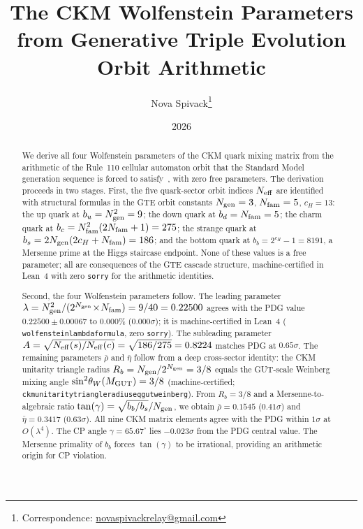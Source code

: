 \documentclass[11pt]{article}
\title{\bfseries The CKM Wolfenstein Parameters\\[0.3em]
from Generative Triple Evolution Orbit Arithmetic}
\author[1]{Nova Spivack\thanks{Correspondence:
  \href{mailto:novaspivackrelay@gmail.com}{novaspivackrelay@gmail.com}}}
\affil[1]{Independent Research}
\date{2026}
\theoremstyle{remark}
\newcommand{\Ngen}{N_{\rm gen}}
\newcommand{\Nfam}{N_{\rm fam}}
\newcommand{\cH}{c_H}
\newcommand{\lean}[1]{%
  \penalty-100
  \begingroup\def\_{\textunderscore\allowbreak}\texttt{#1}\endgroup}
\newcommand{\lam}{\lambda}
\newcommand{\Rbar}{\bar{\rho}}
\newcommand{\Ebar}{\bar{\eta}}
\newcommand{\bu}{b_u}
\newcommand{\bd}{b_d}
\newcommand{\bc}{b_c}
\newcommand{\bs}{b_s}
\newcommand{\bb}{b_b}
\newcommand{\Rb}{R_b}
\newcommand{\sinwsq}{\sin^2\!\theta_W}
\begin{document}
\maketitle
\NovaZenodoAfterTitle

\begin{abstract}
We derive all four Wolfenstein parameters of the CKM quark mixing matrix from
the arithmetic of the Rule~110 cellular automaton orbit that the Standard Model
generation sequence is forced to satisfy~\cite{SpivackCompUniversality},
with zero free parameters.
The derivation proceeds in two stages.
First, the five quark-sector orbit indices $N_{\rm eff}$ are identified with
structural formulas in the GTE orbit constants $\Ngen = 3$, $\Nfam = 5$,
$\cH = 13$: the up quark at $\bu = \Ngen^2 = 9$; the down quark at
$\bd = \Nfam = 5$; the charm quark at $\bc = \Nfam^2(2\Nfam+1) = 275$;
the strange quark at $\bs = 2\Ngen(2\cH+\Nfam) = 186$; and the bottom quark
at $\bb = 2^{\cH}-1 = 8191$, a Mersenne prime at the Higgs staircase endpoint.
None of these values is a free parameter; all are consequences of the GTE
cascade structure, machine-certified in Lean~4 with zero \texttt{sorry}
for the arithmetic identities.

Second, the four Wolfenstein parameters follow.
The leading parameter
$\lam = \Ngen^2/(2^{\Ngen}\!\times\!\Nfam) = 9/40 = 0.22500$
agrees with the PDG value $0.22500\pm 0.00067$ to $\mathbf{0.000\%}$
($0.000\sigma$); it is machine-certified in Lean~4 (\lean{wolfenstein\_lambda\_formula},
zero \texttt{sorry}).
The subleading parameter $A = \sqrt{N_{\rm eff}(s)/N_{\rm eff}(c)} = \sqrt{186/275} = 0.8224$
matches PDG at $0.65\sigma$.
The remaining parameters $\Rbar$ and $\Ebar$ follow from a deep cross-sector
identity: the CKM unitarity triangle radius $\Rb = \Ngen/2^{\Ngen} = 3/8$ equals the
GUT-scale Weinberg mixing angle $\sinwsq(M_{\rm GUT}) = 3/8$
(machine-certified; \lean{ckm\_unitarity\_triangle\_radius\_eq\_gut\_weinberg}).
From $\Rb = 3/8$ and a Mersenne-to-algebraic ratio $\tan(\gamma) = \sqrt{\bb/\bs}/\Ngen$,
we obtain $\Rbar = 0.1545$ ($0.41\sigma$) and $\Ebar = 0.3417$ ($0.63\sigma$).
All nine CKM matrix elements agree with the PDG within $1\sigma$ at $O(\lam^4)$.
The CP angle $\gamma = 65.67^\circ$ lies $-0.023\sigma$ from the PDG central value.
The Mersenne primality of $\bb$ forces $\tan(\gamma)$ to be irrational,
providing an arithmetic origin for CP violation.
\end{abstract}
\end{document}
